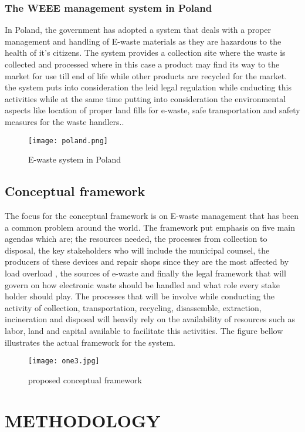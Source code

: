 \documentclass{article}
\begin{document}
\subsubsection{The WEEE management system in Poland}
In Poland, the government has adopted a system that deals with a proper management and handling of E-waste materials as they are hazardous to the health of it's citizens. The system provides a collection site where the waste is collected and processed where in this case a product may find its way to the market for use till end of life while other products are recycled for the market. the system puts into consideration the leid legal regulation while cnducting this activities while at the same time putting into consideration the environmental aspects like location of proper land fills for e-waste, safe transportation and safety measures for the waste handlers.\cite{cholewa2016waste}.
\pagebreak
\begin{figure}[h]
\texttt{[image: poland.png]}
\caption{E-waste system in Poland}
\end{figure}

\subsection{Conceptual framework}
The focus for the conceptual framework is on E-waste management that has been a common problem around the world. The framework put emphasis on five main agendas which are; the resources needed, the processes from collection to disposal, the key stakeholders who will include the municipal counsel, the producers of these devices and repair shops since they are the most affected by load overload , the sources of e-waste and finally the legal framework that will govern on how electronic waste should be handled and what role every stake holder should play. The processes that will be involve while conducting the activity of collection, transportation, recycling, disassemble, extraction, incineration and disposal will heavily rely on the availability of resources such as labor, land and capital available to facilitate this activities.
The figure bellow illustrates the actual framework for the system.
\pagebreak\begin{figure}[h]
\texttt{[image: one3.jpg]}
\caption{proposed conceptual framework}
\end{figure}
\newpage
\section{ METHODOLOGY}
\end{document}
